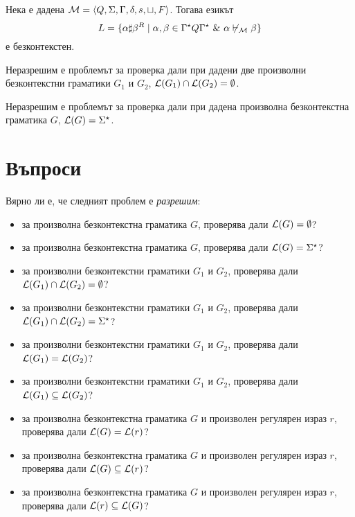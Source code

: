 \begin{lemma}
  Нека е дадена $\mathcal{M} = \langle{Q,\Sigma,\Gamma,\delta,s,\sqcup,F}\rangle$.
  Тогава езикът 
  \[L = \{\alpha\sharp\beta^R \mid \alpha,\beta \in \Gamma^\star Q \Gamma^\star\ \&\  \alpha \not\vdash_{\mathcal{M}} \beta\}\]
  е безконтекстен.
\end{lemma}


\begin{thm}
  Неразрешим е проблемът за проверка дали при дадени две произволни безконтекстни граматики $G_1$ и $G_2$,
  $\mathcal{L}(G_1) \cap \mathcal{L}(G_2) = \emptyset$.  
\end{thm}

\begin{thm}
  Неразрешим е проблемът за проверка дали при дадена произволна безконтекстна граматика $G$,
  $\mathcal{L}(G) = \Sigma^\star$.  
\end{thm}


\section{Въпроси}

Вярно ли е, че следният проблем е {\em разрешим}:
\begin{itemize}
\item
  за произволна безконтекстна граматика $G$, проверява дали $\mathcal{L}(G) = \emptyset$?
\item
  за произволна безконтекстна граматика $G$, проверява дали $\mathcal{L}(G) = \Sigma^\star$?
\item
  за произволни безконтекстни граматики $G_1$ и $G_2$, проверява дали $\mathcal{L}(G_1) \cap \mathcal{L}(G_2) = \emptyset$?
\item
  за произволни безконтекстни граматики $G_1$ и $G_2$, проверява дали $\mathcal{L}(G_1) \cap \mathcal{L}(G_2) = \Sigma^\star$?
\item
  за произволни безконтекстни граматики $G_1$ и $G_2$, проверява дали $\mathcal{L}(G_1) = \mathcal{L}(G_2)$?
\item
  за произволни безконтекстни граматики $G_1$ и $G_2$, проверява дали $\mathcal{L}(G_1) \subseteq \mathcal{L}(G_2)$?
\item
  за произволна безконтекстна граматика $G$ и произволен регулярен израз $r$,
  проверява дали $\mathcal{L}(G) = \mathcal{L}(r)$?
\item
  за произволна безконтекстна граматика $G$ и произволен регулярен израз $r$,
  проверява дали $\mathcal{L}(G) \subseteq \mathcal{L}(r)$?
\item
  за произволна безконтекстна граматика $G$ и произволен регулярен израз $r$,
  проверява дали $\mathcal{L}(r) \subseteq \mathcal{L}(G)$?
\end{itemize}


